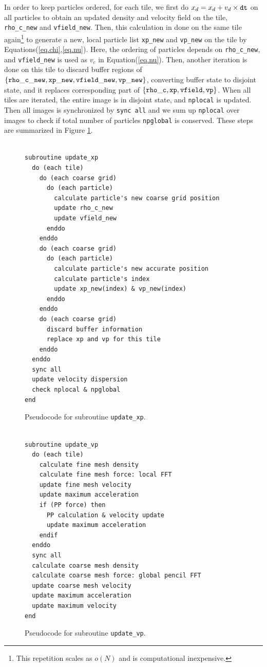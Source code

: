 \documentclass[10pt,twocolumn,preprint]{emulateapj}
\begin{document}
In order to keep particles ordered, for each tile, we first do $x_d=x_d+v_d\times{\tt dt}$ on all particles to obtain an updated density and velocity field on the tile, {\tt rho\_c\_new} and {\tt vfield\_new}. Then, this calculation in done on the same tile again\footnote{This repetition scales as $o(N)$ and is computational inexpensive.} to generate a new, local particle list {\tt xp\_new} and {\tt vp\_new} on the tile by Equations(\ref{eq.chi},\ref{eq.nu}). Here, the ordering of particles depends on {\tt rho\_c\_new}, and {\tt vfield\_new} is used as $v_c$ in Equation(\ref{eq.nu}). Then, another iteration is done on this tile to discard buffer regions of $\{{\tt rho\_c\_new},{\tt xp\_new},{\tt vfield\_new},{\tt vp\_new}\}$, converting buffer state to disjoint state, and it replaces corresponding part of $\{{\tt rho\_c},{\tt xp},{\tt vfield},{\tt vp}\}$. When all tiles are iterated, the entire image is in disjoint state, and {\tt nplocal} is updated. Then all images is synchronized by {\tt sync all} and we sum up {\tt nplocal} over images to check if total number of particles {\tt npglobal} is conserved. These steps are summarized in Figure \ref{fig.update_xp}.

\begin{figure}[t]
\begin{verbatim}

subroutine update_xp
  do (each tile)
    do (each coarse grid)
      do (each particle)
        calculate particle's new coarse grid position
        update rho_c_new
        update vfield_new
      enddo
    enddo
    do (each coarse grid)
      do (each particle)
        calculate particle's new accurate position
        calculate particle's index
        update xp_new(index) & vp_new(index)
      enddo
    enddo
    do (each coarse grid)
      discard buffer information
      replace xp and vp for this tile
    enddo
  enddo
  sync all
  update velocity dispersion
  check nplocal & npglobal
end
\end{verbatim}
\caption{Pseudocode for subroutine {\tt update\_xp}.}
\label{fig.update_xp}
\end{figure}

\begin{figure}[t]
\begin{verbatim}

subroutine update_vp
  do (each tile)
    calculate fine mesh density
    calculate fine mesh force: local FFT
    update fine mesh velocity
    update maximum acceleration
    if (PP force) then
      PP calculation & velocity update
      update maximum acceleration
    endif
  enddo
  sync all
  calculate coarse mesh density
  calculate coarse mesh force: global pencil FFT
  update coarse mesh velocity
  update maximum acceleration
  update maximum velocity
end
\end{verbatim}
\caption{Pseudocode for subroutine {\tt update\_vp}.}
\label{fig.update_vp}
\end{figure}
\end{document}
